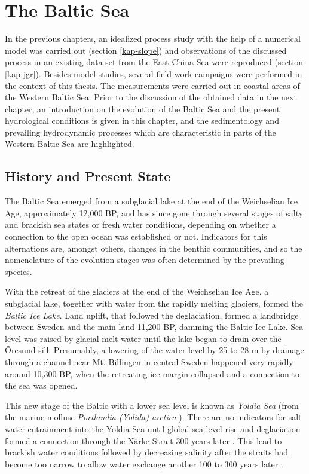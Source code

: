 \chapter{The Baltic Sea}
\label{kap-einleitung}

In the previous chapters, an idealized process study with the help of a 
numerical model was carried out (section \ref{kap-slope}) and observations of 
the discussed process in an existing data set from the East China Sea were 
reproduced (section \ref{kap-jgr}). Besides model studies, several field work 
campaigns were performed in the context of this thesis. The measurements were 
carried out in coastal areas of the Western Baltic Sea. Prior to the discussion 
of the obtained data in the next chapter, an introduction on the evolution of 
the Baltic Sea and the present hydrological conditions is given in this 
chapter, and the sedimentology and prevailing hydrodynamic processes which are 
characteristic in parts of the Western Baltic Sea are highlighted.

\section{History and Present State}

The Baltic Sea emerged from a subglacial lake at the end of the Weichselian Ice 
Age, approximately 12,000 BP, and has since gone through several stages of 
salty and brackish sea states or fresh water conditions, depending on whether a 
connection to the open ocean was established or not. Indicators for this 
alternations are, amongst others, changes in the benthic communities, and so the 
nomenclature of the evolution stages was often determined by the prevailing 
species.

With the retreat of the glaciers at the end of the Weichselian Ice Age, a 
subglacial lake, together with water from the rapidly melting glaciers, formed 
the \textit{Baltic Ice Lake}. Land uplift, that followed the deglaciation, 
formed a landbridge between Sweden and the main land 11,200 BP, damming the 
Baltic Ice Lake. Sea level was raised by glacial melt water until the lake began 
to drain over the Öresund sill. Presumably, a lowering of the water level by 25 
to 28 m by drainage through a channel near Mt. Billingen in central Sweden 
happened very rapidly around 10,300 BP, when the retreating ice margin collapsed 
\citep[][]{bjoerk95,tikkanen2002} and a connection to the sea was opened. 

This new stage of the Baltic with a lower sea level is known as \textit{Yoldia 
Sea} (from the marine mollusc \textit{Portlandia (Yolida) arctica} 
\citep[][]{schoning2001}). There are no indicators for salt water entrainment 
into the Yoldia Sea until global sea level rise and deglaciation formed a 
connection through the Närke Strait 300 years later \citep[][]{schoning2001}. 
This lead to brackish water conditions followed by decreasing salinity after the 
straits had become too narrow to allow water exchange another 100 to 300 years 
later \citep[][]{bjoerk95}.

